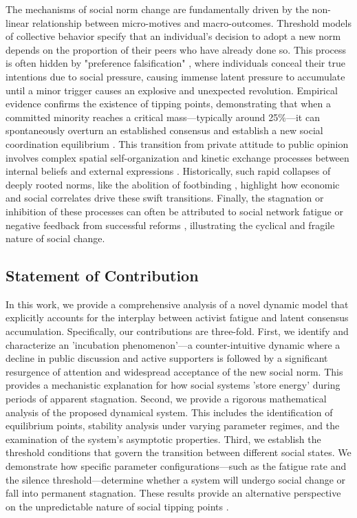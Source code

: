 \documentclass{article}
\begin{document}
The mechanisms of social norm change are fundamentally driven by the non-linear relationship between micro-motives and macro-outcomes. Threshold models of collective behavior \cite{doi:10.1086/226707} specify that an individual's decision to adopt a new norm depends on the proportion of their peers who have already done so. This process is often hidden by "preference falsification" \cite{kuran1991now}, where individuals conceal their true intentions due to social pressure, causing immense latent pressure to accumulate until a minor trigger causes an explosive and unexpected revolution. Empirical evidence confirms the existence of tipping points, demonstrating that when a committed minority reaches a critical mass—typically around 25\%—it can spontaneously overturn an established consensus and establish a new social coordination equilibrium \cite{doi:10.1126/science.aas8827, doi:10.1073/pnas.1418838112}. This transition from private attitude to public opinion involves complex spatial self-organization \cite{nowak1990private} and kinetic exchange processes between internal beliefs and external expressions \cite{10.1098/rsta.2021.0169}. Historically, such rapid collapses of deeply rooted norms, like the abolition of footbinding \cite{brown2018economic}, highlight how economic and social correlates drive these swift transitions. Finally, the stagnation or inhibition of these processes can often be attributed to social network fatigue \cite{ravindran2014antecedents} or negative feedback from successful reforms \cite{jain_public_nodate}, illustrating the cyclical and fragile nature of social change.

\subsection{Statement of Contribution}

In this work, we provide a comprehensive analysis of a novel dynamic model that explicitly accounts for the interplay between activist fatigue and latent consensus accumulation. Specifically, our contributions are three-fold. First, we identify and characterize an 'incubation phenomenon'—a counter-intuitive dynamic where a decline in public discussion and active supporters is followed by a significant resurgence of attention and widespread acceptance of the new social norm. This provides a mechanistic explanation for how social systems 'store energy' during periods of apparent stagnation. Second, we provide a rigorous mathematical analysis of the proposed dynamical system. This includes the identification of equilibrium points, stability analysis under varying parameter regimes, and the examination of the system's asymptotic properties. Third, we establish the threshold conditions that govern the transition between different social states. We demonstrate how specific parameter configurations—such as the fatigue rate and the silence threshold—determine whether a system will undergo social change or fall into permanent stagnation. These results provide an alternative perspective on the unpredictable nature of social tipping points \cite{ravindran2014antecedents, kuran1991now}.
\end{document}
